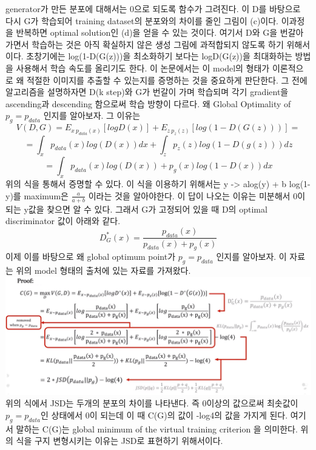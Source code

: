 \documentclass[extendedabs]{bmvc2k}
\begin{document}
 generator가 만든 분포에 대해서는 0으로 되도록 함수가 그려진다. 이 D를 바탕으로 다시 G가 학습되어 training dataset의 분포와의 차이를 줄인 그림이 (c)이다.
 이과정을 반복하면 optimal solution인 (d)을 얻을 수 있는 것이다. 여기서 D와 G을 번갈아 가면서 학습하는 것은 아직 확실하지 않은 생성 그림에 과적합되지 않도록 하기 위해서 이다.
 초창기에는 log(1-D(G(z)))을 최소화하기 보다는 logD(G(z))을 최대화하는 방법을 사용해서 학습 속도를 올리기도 한다.
 이 논문에서는 이 model의 형태가 이론적으로 왜 적절한 이미지를 추출할 수 있는지를 증명하는 것을 중요하게 판단한다. 
 그 전에 알고리즘을 설명하자면 D(k step)와 G가 번갈이 가며 학습되며 각기 gradient을 ascending과 descending 함으로써 학습 방향이 다르다.
 왜  Global Optimality of $p_g = p_{data}$ 인지를 알아보자. 그 이유는 
 $$ V(D,G) = E_{x ~ p_{data}(x)}[log D(x)] + E_{z~p_z(z)}[log(1-D(G(z)))] = $$
 $$ = \int_{x} p_{data}(x)log(D(x)) dx + \int_{z} p_z(z)log(1-D(g(z)))dz$$
 $$ = \int_{x} p_{data}(x)log(D(x)) + p_g(x)log(1-D(x)) dx $$
 위의 식을 통해서 증명할 수 있다. 이 식을 이용하기 위해서는 y -> alog(y) + b log(1-y)를 maximum은 $\frac{a}{a+b}$ 이라는 것을 알아야한다. 
 이 답이 나오는 이유는 미분해서 0이 되는 y값을 찾으면 알 수 있다. 그래서 G가 고정되어 있을 때 D의 optimal discriminator 값이 아래와 같다.
 $$D_G^*(x) = \frac{p_{data}(x)}{p_{data}(x)+p_g(x)}$$
 이제 이를 바탕으로 왜 global optimum point가 $p_g = p_{data}$ 인지를 알아보자. 이 자료는 위의 model 형태의 출처에 있는 자료를 가져왔다.
 \newline  \includegraphics[width=\linewidth]{images/07_GAN.PNG}
 위의 식에서 JSD는 두개의 분포의 차이를 나타낸다. 즉 0이상의 값으로써 최솟값이 $p_g = p_{data}$인 상태에서 0이 되는데 이 때 C(G)의 값이 -log4의 값을 가지게 된다. 
 여기서 말하는 C(G)는 global minimum of the virtual training criterion 을 의미한다. 위의 식을 구지 변형시키는 이유는 JSD로 표현하기 위해서이다.
\end{document}
